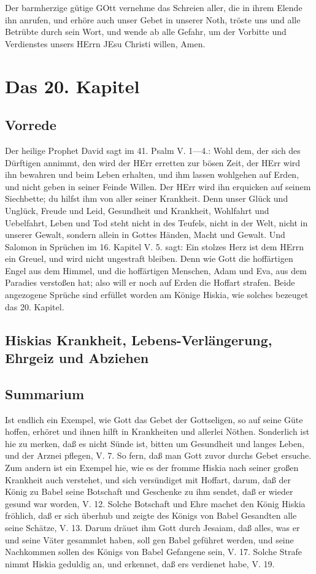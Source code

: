 Der barmherzige gütige GOtt vernehme das Schreien aller, die in ihrem Elende ihn anrufen, und erhöre auch unser Gebet in unserer Noth, tröste uns und alle Betrübte durch sein Wort, und wende ab alle Gefahr, um der Vorbitte und Verdienstes unsers HErrn JEsu Christi willen, Amen.

\chapter{Das 20. Kapitel}

\section{Vorrede}

Der heilige Prophet David sagt im 41. Psalm V. 1—4.: Wohl dem, der sich des Dürftigen annimmt, den wird der HErr erretten zur bösen Zeit, der HErr wird ihn bewahren und beim Leben erhalten, und ihm lassen wohlgehen auf Erden, und nicht geben in seiner Feinde Willen. Der HErr wird ihn erquicken auf seinem Siechbette; du hilfst ihm von aller seiner Krankheit. Denn unser Glück und Unglück, Freude und Leid, Gesundheit und Krankheit, Wohlfahrt und Uebelfahrt, Leben und Tod steht nicht in des Teufels, nicht in der Welt, nicht in unserer Gewalt, sondern allein in Gottes Händen, Macht und Gewalt. Und Salomon in Sprüchen im 16. Kapitel V. 5. sagt: Ein stolzes Herz ist dem HErrn ein Greuel, und wird nicht ungestraft bleiben. Denn wie Gott die hoffärtigen Engel aus dem Himmel, und die hoffärtigen Menschen, Adam und Eva, aus dem Paradies verstoßen hat; also will er noch auf Erden die Hoffart strafen. Beide angezogene Sprüche sind erfüllet worden am Könige Hiskia, wie solches bezeuget das 20. Kapitel.

\section{Hiskias Krankheit, Lebens-Verlängerung, Ehrgeiz und Abziehen}

\section{Summarium}

Ist endlich ein Exempel, wie Gott das Gebet der Gottseligen, so auf seine Güte hoffen, erhöret und ihnen hilft in Krankheiten und allerlei Nöthen. Sonderlich ist hie zu merken, daß es nicht Sünde ist, bitten um Gesundheit und langes Leben, und der Arznei pflegen, V. 7. So fern, daß man Gott zuvor durchs Gebet ersuche. Zum andern ist ein Exempel hie, wie es der fromme Hiskia nach seiner großen Krankheit auch verstehet, und sich versündiget mit Hoffart, darum, daß der König zu Babel seine Botschaft und Geschenke zu ihm sendet, daß er wieder gesund war worden, V. 12. Solche Botschaft und Ehre machet den König Hiskia fröhlich, daß er sich überhub und zeigte des Königs von Babel Gesandten alle seine Schätze, V. 13. Darum dräuet ihm Gott durch Jesaiam, daß alles, was er und seine Väter gesammlet haben, soll gen Babel geführet werden, und seine Nachkommen sollen des Königs von Babel Gefangene sein, V. 17. Solche Strafe nimmt Hiskia geduldig an, und erkennet, daß ers verdienet habe, V. 19.

